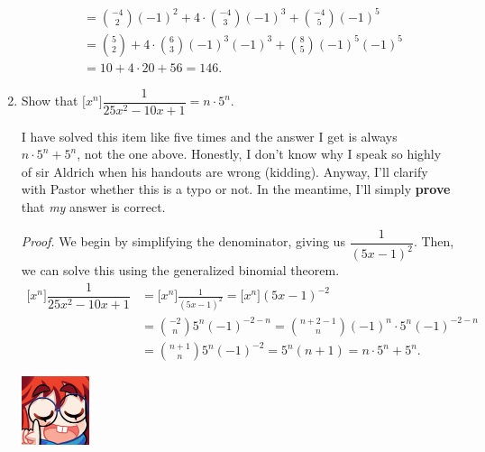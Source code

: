 \documentclass{article}
\begin{document}
\begin{enumerate}
\begin{align*}
        &= \binom{-4}{2} {(-1)}^2 + 4 \cdot \binom{-4}{3} {(-1)}^3 + \binom{-4}{5} {(-1)}^5 \\ 
        &= \binom{5}{2} + 4 \cdot \binom{6}{3} {(-1)}^3 {(-1)}^3 + \binom{8}{5} {(-1)}^5 {(-1)}^5 \\ 
        &= 10 + 4 \cdot 20 + 56 = 146. \tag*{$\blacksquare$}
    \end{align*} 
    \item Show that $\big[x^n\big] \dfrac{1}{25x^2 -10x +1} = n \cdot 5^n$.\par
    I have solved this item like five times and the answer I get is always $n \cdot 5^n + 5^n $, not the one above. Honestly, I don't know
    why I speak so highly of sir Aldrich when his handouts are wrong (kidding). Anyway, I'll clarify with Pastor whether this is a typo or not. In the meantime, 
    I'll simply \textbf{prove} that \textit{my} answer is correct.\par 
        \textit{Proof.} We begin by simplifying the denominator, giving us $\dfrac{1}{{(5x-1)}^2}$. Then, we can solve this using the generalized binomial theorem.\begin{align*} 
            \big[x^n\big] \dfrac{1}{25x^2 -10x +1} &= \big[x^n\big] \frac{1}{{(5x-1)}^2} = \big[x^n\big] {(5x-1)}^{-2} \\
            &= \binom{-2}{n} 5^n {(-1)}^{-2-n} = \binom{n+2-1}{n} {(-1)}^{n} \cdot 5^n {(-1)}^{-2-n} \\ 
            &= \binom{n+1}{n} 5^n {(-1)}^{-2} = 5^n (n+1) = n\cdot 5^n + 5^n. \tag*{$\qedsymbol$}
        \end{align*}     
    \par\begin{minipage}[t]{.14\textwidth}
        \vspace{0pt}
        \includegraphics[width=2cm]{nerd_maddy.png} 
    \end{minipage}%
\end{enumerate}
\end{document}
